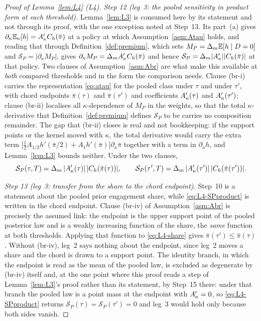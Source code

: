 \begin{proof}[Proof of Lemma~\ref{lem:L4} (L4)]
\emph{Step 12 (leg~3: the pooled sensitivity in product form at each threshold).}
Lemma~\ref{lem:L3} is consumed here by its statement and not through its proof, with the one
exception noted at Step~13. Its part~(a) gives
$\partial_\kappa\mathbb{E}_\kappa[h] = A'_{\kappa} C_h(\bar\pi)$ at a policy at which
Assumption~\ref{asm:Atau} holds, and reading that through Definition~\ref{def:premium}, which sets
$M_P = \Delta_m\mathbb{E}[h \mid D=0]$ and $\mathcal S_P = \lvert\partial_\kappa M_P\rvert$, gives
$\partial_\kappa M_P = \Delta_mA'_{\kappa} C_h(\bar\pi)$ and hence
$\mathcal S_P = \Delta_m\lvert A'_{\kappa}\rvert\lvert C_h(\bar\pi)\rvert$ at that policy. Two clauses of
Assumption~\ref{asm:Abr} are what make this available at \emph{both} compared thresholds and in the
form the comparison needs. Clause (br-i) carries the
representation \eqref{eq:atau} for the pooled class under $\tau$ and under $\tau'$, with chord
endpoints $\bar\pi(\tau)$ and $\bar\pi(\tau')$ and coefficients $A'_{\kappa}(\tau)$ and $A'_{\kappa}(\tau')$;
clause (br-ii) localises all $\kappa$-dependence of $M_P$ in the weights, so that the total
$\kappa$-derivative that Definition~\ref{def:premium} defines $\mathcal S_P$ to be carries no
composition remainder. The gap that (br-ii) closes is real and not bookkeeping: if the support points
or the kernel moved with $\kappa$, the total derivative would carry the extra term
$\bigl[\tfrac12 A_{1/2}h'(\bar\pi/2)+A_1h'(\bar\pi)\bigr]\partial_\kappa\bar\pi$ together with a term
in $\partial_\kappa h$, and Lemma~\ref{lem:L3} bounds neither. Under the two clauses,
\begin{equation}
\label{eq:L4-SPproduct}
\mathcal S_P(\tau,T) = \Delta_m\,\lvert A'_{\kappa}(\tau)\rvert\,\lvert C_h(\bar\pi(\tau))\rvert,
\qquad
\mathcal S_P(\tau',T) = \Delta_m\,\lvert A'_{\kappa}(\tau')\rvert\,\lvert C_h(\bar\pi(\tau'))\rvert .
\end{equation}

\emph{Step 13 (leg~3: transfer from the share to the chord endpoint).} Step~10 is a statement about
the pooled prior engagement share, while \eqref{eq:L4-SPproduct} is written in the chord endpoint.
Clause (br-iv) of Assumption~\ref{asm:Abr} is precisely the assumed link: the endpoint is the upper
support point of the pooled posterior law and is a weakly increasing function of the share, the
\emph{same} function at both thresholds. Applying that function to \eqref{eq:L4-share} gives
$\bar\pi(\tau') \le \bar\pi(\tau)$. Without (br-iv), leg~2 says nothing about the endpoint, since
leg~2 moves a share and the chord is drawn to a support point. The identity branch, in which the
endpoint is read as the mean of the pooled law, is excluded as degenerate by (br-iv) itself and, at
the one point where this proof reads a step of Lemma~\ref{lem:L3}'s proof rather than its statement,
by Step~15 there: under that branch the pooled law is a point mass at the endpoint
with $A'_{\kappa} = 0$, so \eqref{eq:L4-SPproduct} returns
$\mathcal S_P(\tau) = \mathcal S_P(\tau') = 0$ and leg~3 would hold only because both sides vanish.


\end{proof}

